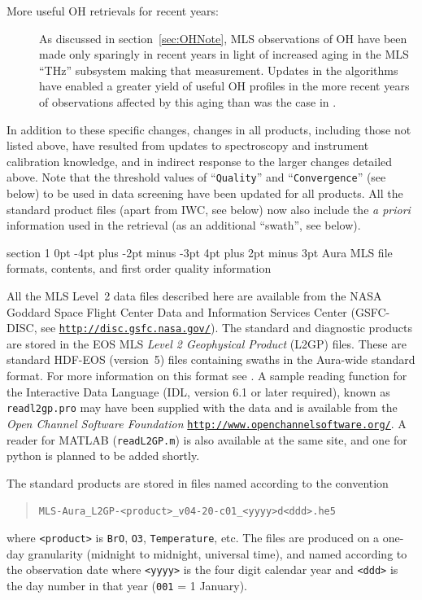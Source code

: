 \documentclass[11pt,draft]{report}
\makeatletter
\renewcommand{\section}{\@startsection%
  {section}%
  {1}%
  {0pt}%
  {-4pt plus -2pt minus -3pt}%
  {4pt plus 2pt minus 3pt}%
  {\Large\sffamily\fontseries{sb}\selectfont\flushleft\color{SectionColor}\figureversion{tabular}}}%
\makeatother
\begin{document}
\begin{description}
\item[More useful OH retrievals for recent years:] As discussed in
  section~\ref{sec:OHNote}, MLS observations of OH have been made only
  sparingly in recent years in light of increased aging in the MLS
  ``THz'' subsystem making that measurement.  Updates in the \thisv
  algorithms have enabled a greater yield of useful OH profiles in the
  more recent years of observations affected by this aging than was the
  case in \prevv.
\end{description}

In addition to these specific changes, changes in all products,
including those not listed above, have resulted from updates to
spectroscopy and instrument calibration knowledge, and in indirect
response to the larger changes detailed above.  Note that the threshold
values of ``\texttt{Quality}'' and ``\texttt{Convergence}'' (see below)
to be used in data screening have been updated for all products.  All
the standard product files (apart from IWC, see below) now also include
the \emph{a priori} information used in the retrieval (as an additional
``swath'', see below).

\section{Aura MLS file formats, contents, and first order
  quality information}
\label{sec:FilesAndFormats}
\label{sec:NegativePrecision}

All the MLS Level~2 data files described here are available from the
NASA Goddard Space Flight Center Data and Information Services Center
(GSFC-DISC, see
\href{http://disc.gsfc.nasa.gov/}{\texttt{http://disc.gsfc.nasa.gov/}}).
The standard and diagnostic products are stored in the EOS MLS
\emph{Level 2 Geophysical Product} (L2GP) files.  These are standard
HDF-EOS (version~5) files containing swaths in the Aura-wide standard
format.  For more information on this format see
\citet{AuraFileConventions}.  A sample reading function for the
Interactive Data Language (IDL, version 6.1 or later required), known as
\texttt{readl2gp.pro} may have been supplied with the data and is
available from the \emph{Open Channel Software Foundation}
\href{http://www.openchannelsoftware.org/}{\texttt{http://www.openchannelsoftware.org/}}.
A reader for MATLAB (\texttt{readL2GP.m}) is also available at the same
site, and one for python is planned to be added shortly.

The standard products are stored in files named according to the convention
\begin{quote}
\verb+MLS-Aura_L2GP-<product>_v04-20-c01_<yyyy>d<ddd>.he5+
\end{quote}
where \verb+<product>+ is \texttt{BrO}, \texttt{O3},
\texttt{Temperature}, etc.  The files are produced on a one-day
granularity (midnight to midnight, universal time), and named according
to the observation date where \verb+<yyyy>+ is the four digit calendar
year and \verb+<ddd>+ is the day number in that year (\texttt{001} = 1
January).
\end{document}
